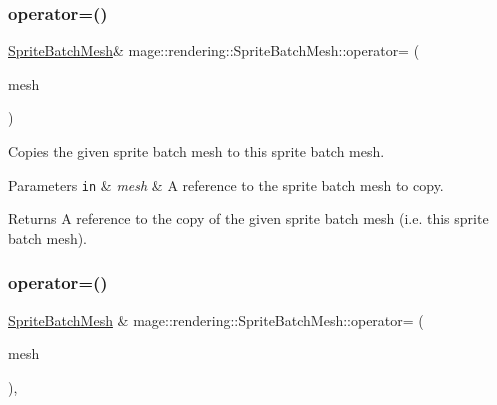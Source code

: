 \subsubsection{\texorpdfstring{operator=()}{operator=()}\hspace{0.1cm}{\footnotesize\ttfamily [1/2]}}
{\footnotesize\ttfamily \mbox{\hyperlink{classmage_1_1rendering_1_1_sprite_batch_mesh}{Sprite\+Batch\+Mesh}}\& mage\+::rendering\+::\+Sprite\+Batch\+Mesh\+::operator= (\begin{DoxyParamCaption}\item[{const \mbox{\hyperlink{classmage_1_1rendering_1_1_sprite_batch_mesh}{Sprite\+Batch\+Mesh}} \&}]{mesh }\end{DoxyParamCaption})\hspace{0.3cm}{\ttfamily [delete]}}

Copies the given sprite batch mesh to this sprite batch mesh.


\begin{DoxyParams}[1]{Parameters}
\mbox{\tt in}  & {\em mesh} & A reference to the sprite batch mesh to copy. \\
\hline
\end{DoxyParams}
\begin{DoxyReturn}{Returns}
A reference to the copy of the given sprite batch mesh (i.\+e. this sprite batch mesh). 
\end{DoxyReturn}
\mbox{\label{classmage_1_1rendering_1_1_sprite_batch_mesh_a9ab382cdbdb112391eb857e139f6399a}} 
\subsubsection{\texorpdfstring{operator=()}{operator=()}\hspace{0.1cm}{\footnotesize\ttfamily [2/2]}}
{\footnotesize\ttfamily \mbox{\hyperlink{classmage_1_1rendering_1_1_sprite_batch_mesh}{Sprite\+Batch\+Mesh}} \& mage\+::rendering\+::\+Sprite\+Batch\+Mesh\+::operator= (\begin{DoxyParamCaption}\item[{\mbox{\hyperlink{classmage_1_1rendering_1_1_sprite_batch_mesh}{Sprite\+Batch\+Mesh}} \&\&}]{mesh }\end{DoxyParamCaption})\hspace{0.3cm}{\ttfamily [default]}, {\ttfamily [noexcept]}}


